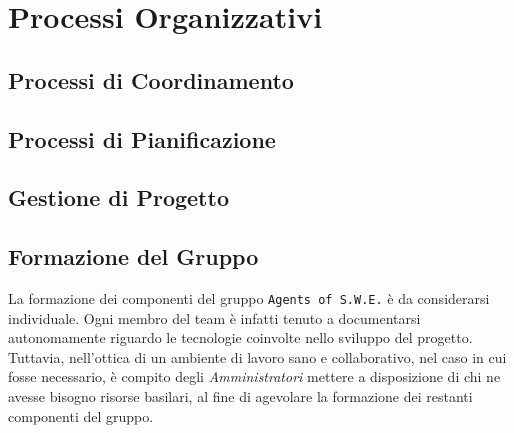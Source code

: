 \section{Processi Organizzativi}\label{ProcessiOrganizzativi}

\subsection{Processi di Coordinamento}\label{ProcessiOrganizzativi_ProcessiCoordinamento}


\subsection{Processi di Pianificazione}



\subsection{Gestione di Progetto}\label{ProcessiOrganizzativi_GestioneProgetto}


\subsection{Formazione del Gruppo}\label{ProcessiOrganizzativi_FormazioneGruppo}
	La formazione dei componenti del gruppo \texttt{Agents of S.W.E.} è da considerarsi individuale. Ogni membro del team è infatti tenuto a documentarsi autonomamente riguardo le tecnologie coinvolte nello sviluppo del 								progetto\glossario. Tuttavia, nell'ottica di un ambiente di lavoro sano e collaborativo, nel caso in cui fosse necessario, è compito degli \textit{Amministratori} mettere a disposizione di chi ne avesse bisogno risorse basilari, al fine di	agevolare la formazione dei restanti componenti del gruppo.
	

